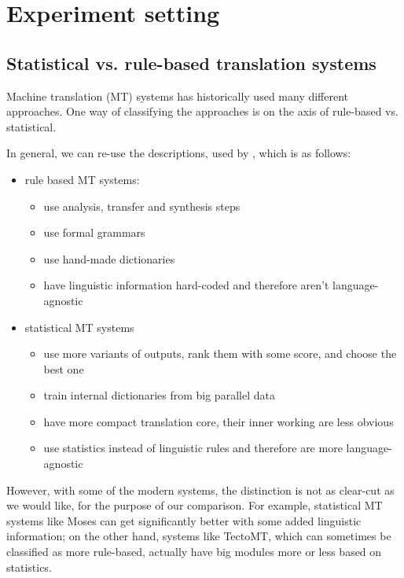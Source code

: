 \chapter{Experiment setting}
\section{Statistical vs. rule-based translation systems}

Machine translation (MT) systems has historically used many different approaches. One way of classifying the approaches is on the axis of rule-based vs. statistical.

In general, we can re-use the descriptions, used by \cite{bojar}, which is as follows:
\begin{itemize}
\item rule based MT systems:
\begin{itemize}
\item use analysis, transfer and synthesis steps
\item use formal grammars
\item use hand-made dictionaries
\item have linguistic information hard-coded and therefore aren't language-agnostic
\end{itemize}
\item statistical MT systems
\begin{itemize}
    \item use more variants of outputs, rank them with some score, and choose the best one
    \item train internal dictionaries from big parallel data
    \item have more compact translation core, their inner working are less obvious
    \item use statistics instead of linguistic rules and therefore are more language-agnostic
\end{itemize}
\end{itemize}

However, with some of the modern systems, the distinction is not as clear-cut as we would like, for the purpose of our comparison. 
For example, statistical MT systems like Moses can get significantly better with some added linguistic information; 
on the other hand, systems like TectoMT, which can sometimes be classified as more rule-based, actually have big modules more or less based on statistics.

